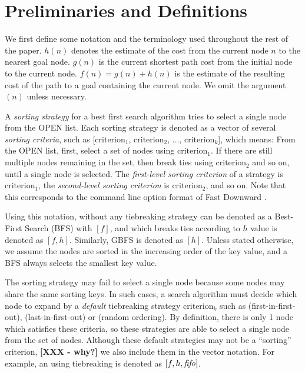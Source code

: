 \section{Preliminaries and Definitions}

\label{sec:preliminaries}

We first define some notation and the terminology used throughout the
rest of the paper.
$h(n)$ denotes the estimate of the cost from the current node $n$ to the nearest goal node.
$g(n)$ is the current shortest path cost from the initial node to the current node.
$f(n)=g(n)+h(n)$ is the estimate of the resulting cost of the path to a goal
containing the current node.
We omit the argument $(n)$ unless necessary.

A \emph{sorting strategy} for a best first search algorithm 
tries to select a single node from the OPEN list.
Each sorting strategy is denoted as a vector of several \emph{sorting criteria}, such as
[$\text{criterion}_1$, $\text{criterion}_2$, $\ldots$,
$\text{criterion}_k$], which means: From the OPEN list, first, select a
set of nodes using $\text{criterion}_1$.  If there are still multiple
nodes remaining in the set, then break ties using $\text{criterion}_2$
and so on, until a single node is selected.  The \emph{first-level
sorting criterion} of a strategy is $\text{criterion}_1$, the
\emph{second-level sorting criterion} is $\text{criterion}_2$, and so on.
Note that this corresponds to the command line option format of Fast
Downward \cite{Helmert2006}.

Using this notation, \astar without any tiebreaking strategy can be
denoted as a Best-First Search (BFS) with $[f]$, and \astar which breaks ties according to $h$
value is denoted as $[f,h]$. Similarly, GBFS is denoted as 
$[h]$.  Unless stated otherwise, we assume the nodes are sorted in the
increasing order of the key value, and a BFS always selects the smallest
key value.

The sorting strategy may fail to select a single node because some nodes
may share the same sorting keys. In such cases, a search algorithm must
decide which node to expand by a \emph{default} tiebreaking
strategy $\text{criterion}_k$ such as  \fifo (first-in-first-out), \lifo
(last-in-first-out) or \ro (random ordering).  
By definition, there is only 1 node which satisfies these criteria, so these
strategies are able to select a single node from the set of
nodes. Although these default strategies may not be a ``sorting''
criterion, {\bf [XXX - why?]}
 we also include them in the vector notation. For
example, an \astar using \fifo tiebreaking is denoted as $[f,h,{\text{\textit{fifo}}}]$.


